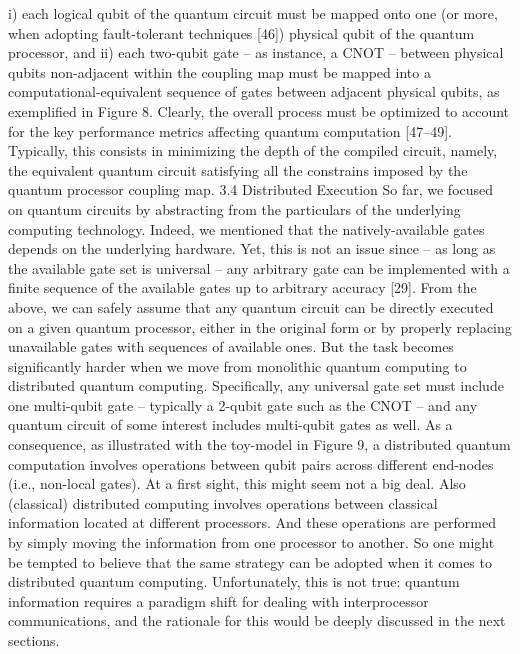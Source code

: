 i) each logical qubit of the quantum circuit must be mapped onto one (or more, when adopting fault-tolerant techniques [46]) physical qubit of the quantum processor, and ii) each two-qubit gate – as instance, a CNOT – between physical qubits non-adjacent within the coupling map must be mapped into a computational-equivalent sequence of gates between adjacent physical qubits, as exemplified in Figure 8. Clearly, the overall process must be optimized to account for the key performance metrics affecting quantum computation [47–49]. Typically, this consists in minimizing the depth of the compiled circuit, namely, the equivalent quantum circuit satisfying all the constrains imposed by the quantum processor coupling map. 3.4 Distributed Execution So far, we focused on quantum circuits by abstracting from the particulars of the underlying computing technology. Indeed, we mentioned that the natively-available gates depends on the underlying hardware. Yet, this is not an issue since – as long as the available gate set is universal – any arbitrary gate can be implemented with a finite sequence of the available gates up to arbitrary accuracy [29]. From the above, we can safely assume that any quantum circuit can be directly executed on a given quantum processor, either in the original form or by properly replacing unavailable gates with sequences of available ones. But the task becomes significantly harder when we move from monolithic quantum computing to distributed quantum computing. Specifically, any universal gate set must include one multi-qubit gate – typically a 2-qubit gate such as the CNOT – and any quantum circuit of some interest includes multi-qubit gates as well. As a consequence, as illustrated with the toy-model in Figure 9, a distributed quantum computation involves operations between qubit pairs across different end-nodes (i.e., non-local gates). At a first sight, this might seem not a big deal. Also (classical) distributed computing involves operations between classical information located at different processors. And these operations are performed by simply moving the information from one processor to another. So one might be tempted to believe that the same strategy can be adopted when it comes to distributed quantum computing. Unfortunately, this is not true: quantum information requires a paradigm shift for dealing with interprocessor communications, and the rationale for this would be deeply discussed in the next sections.

